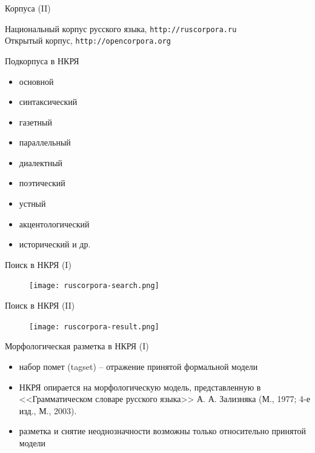 \documentclass{beamer}
\begin{document}
\begin{frame}{Корпуса (II)}
\begin{center}
Национальный корпус русского языка, \texttt{http://ruscorpora.ru}\\
Открытый корпус, \texttt{http://opencorpora.org}
\end{center}
\end{frame}

\begin{frame}{Подкорпуса в НКРЯ}
\begin{itemize}
	\item основной
	\item синтаксический
	\item газетный
	\item параллельный
	\item диалектный
	\item поэтический
	\item устный
	\item акцентологический
	\item исторический и др.
\end{itemize}
\end{frame}

\begin{frame}{Поиск в НКРЯ (I)}
\begin{center}
	\begin{figure}[H]
		\texttt{[image: ruscorpora-search.png]} 
	\end{figure}
\end{center}	
\end{frame}

\begin{frame}{Поиск в НКРЯ (II)}
\begin{center}
	\begin{figure}[H]
		\texttt{[image: ruscorpora-result.png]} 
	\end{figure}
\end{center}	
\end{frame}

\begin{frame}{Морфологическая разметка в НКРЯ (I)}
\begin{itemize}
    \item набор помет (tagset) -- отражение принятой формальной модели
	\item НКРЯ опирается на морфологическую модель, представленную в <<Грамматическом словаре русского языка>> А. А. Зализняка (М., 1977; 4-е изд., М., 2003).
	\item разметка и снятие неоднозначности возможны только относительно принятой модели
\end{itemize}
\end{frame}
\end{document}
